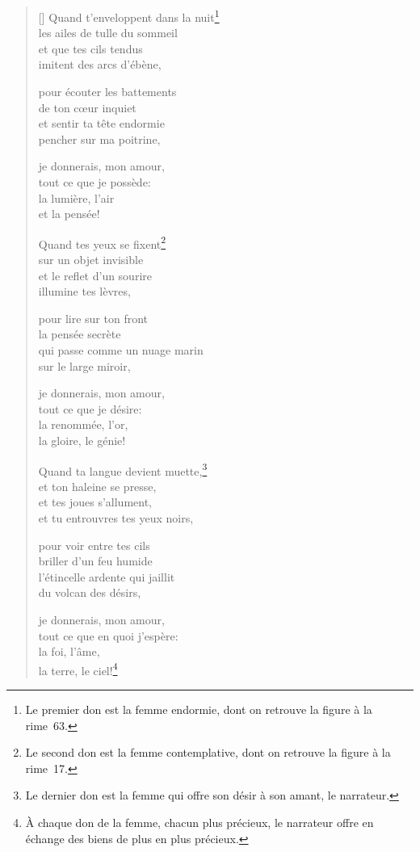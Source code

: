 \documentclass[a4paper,12pt]{book}
\begin{document}
\settowidth{\versewidth}{Quand t'enveloppent dans la nuit}

\begin{verse}[\versewidth]
  Quand t'enveloppent dans la nuit\footnote{Le premier don est la
  femme endormie, dont on retrouve la figure à la rime~63.} \\
  les ailes de tulle du sommeil \\
  et que tes cils tendus \\
  imitent des arcs d'ébène,

  pour écouter les battements \\
  de ton cœur inquiet \\
  et sentir ta tête endormie \\
  pencher sur ma poitrine,

  je donnerais, mon amour, \\
  tout ce que je possède: \\
  la lumière, l'air \\
  et la pensée!

  Quand tes yeux se fixent\footnote{Le second don est la femme
  contemplative, dont on retrouve la figure à la rime~17.} \\
  sur un objet invisible \\
  et le reflet d'un sourire \\
  illumine tes lèvres,

  pour lire sur ton front \\
  la pensée secrète \\
  qui passe comme un nuage marin \\
  sur le large miroir,

  je donnerais, mon amour, \\
  tout ce que je désire: \\
  la renommée, l'or, \\
  la gloire, le génie!

  Quand ta langue devient muette,\footnote{Le dernier don est la femme
  qui offre son désir à son amant, le narrateur.} \\
  et ton haleine se presse, \\
  et tes joues s'allument, \\
  et tu entrouvres tes yeux noirs,

  pour voir entre tes cils \\
  briller d'un feu humide \\
  l'étincelle ardente qui jaillit \\
  du volcan des désirs,

  je donnerais, mon amour, \\
  tout ce que en quoi j'espère: \\
  la foi, l'âme, \\
  la terre, le ciel!\footnote{À chaque don de la femme, chacun plus
  précieux, le narrateur offre en échange des biens de plus en plus
  précieux.}
\end{verse}
\end{document}
